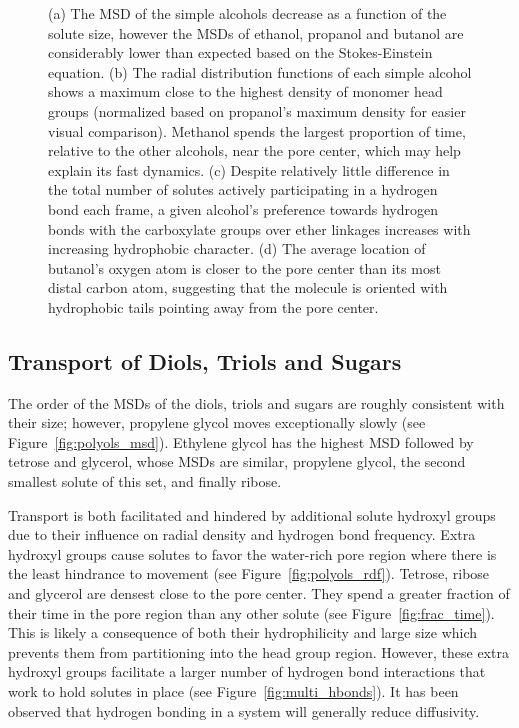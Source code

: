 \documentclass[journal=jpcbfk,manuscript=article]{achemso}
\begin{document}
\begin{figure}[!htb]
  \caption{(a) The MSD of the simple alcohols decrease as a function of the
  solute size, however the MSDs of ethanol, propanol and butanol are considerably
  lower than expected based on the Stokes-Einstein equation. (b) The radial 
  distribution functions of each simple alcohol shows a maximum close to the
  highest density of monomer head groups (normalized based on propanol's maximum
  density for easier visual comparison). Methanol spends the largest proportion 
  of time, relative to the other alcohols, near the pore center, which may help
  explain its fast dynamics. (c) Despite relatively little difference in the 
  total number of solutes actively participating in a hydrogen bond each frame,
  a given alcohol's preference towards hydrogen bonds with the carboxylate groups
  over ether linkages increases with increasing hydrophobic character. (d) The average location of 
  butanol's oxygen atom is closer to the pore center than its most distal carbon
  atom, suggesting that the molecule is oriented with hydrophobic tails pointing
  away from the pore center.}\label{fig:simple_alcohols}
  \end{figure}

  \subsection{Transport of Diols, Triols and Sugars}\label{section:polyols}
  
  The order of the MSDs of the diols, triols and sugars are roughly consistent with 
  their size; however, propylene glycol moves exceptionally slowly (see 
  Figure~\ref{fig:polyols_msd}). Ethylene glycol has the highest MSD followed
  by tetrose and glycerol, whose MSDs are similar, propylene glycol, the second
  smallest solute of this set, and finally ribose.
  
  Transport is both facilitated and hindered by additional solute hydroxyl groups
  due to their influence on radial density and hydrogen bond frequency. Extra 
  hydroxyl groups cause solutes to favor the water-rich pore region where there 
  is the least hindrance to movement (see Figure~\ref{fig:polyols_rdf}). Tetrose,
  ribose and glycerol are densest close to the pore center. They spend a greater
  fraction of their time in the pore region than any other solute (see 
  Figure~\ref{fig:frac_time}). This is likely a consequence of both their 
  hydrophilicity and large size which prevents them from partitioning into the 
  head group region. However, these extra hydroxyl groups facilitate a larger 
  number of hydrogen bond interactions that work to hold solutes in place (see 
  Figure~\ref{fig:multi_hbonds}). It has been observed that hydrogen bonding 
  in a system will generally reduce diffusivity.~\cite{srinivas_computer_1999}
  
\end{document}
